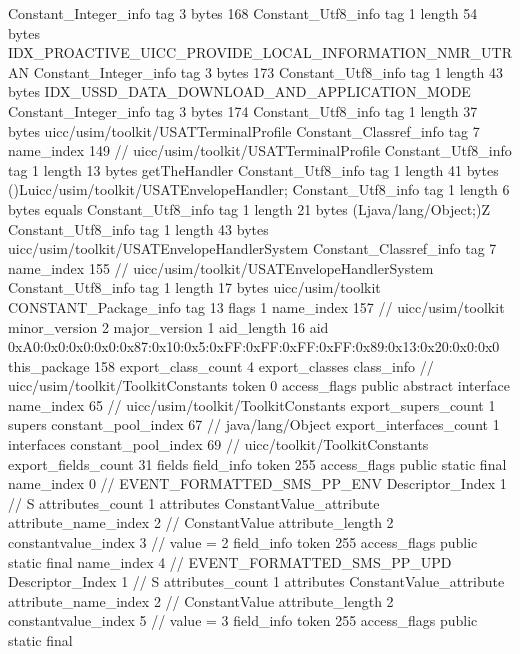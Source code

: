 {{{		}
		Constant_Integer_info {
			tag	3
			bytes	168
		}
		Constant_Utf8_info {
			tag	1
			length	54
			bytes	IDX_PROACTIVE_UICC_PROVIDE_LOCAL_INFORMATION_NMR_UTRAN
		}
		Constant_Integer_info {
			tag	3
			bytes	173
		}
		Constant_Utf8_info {
			tag	1
			length	43
			bytes	IDX_USSD_DATA_DOWNLOAD_AND_APPLICATION_MODE
		}
		Constant_Integer_info {
			tag	3
			bytes	174
		}
		Constant_Utf8_info {
			tag	1
			length	37
			bytes	uicc/usim/toolkit/USATTerminalProfile
		}
		Constant_Classref_info {
			tag	7
			name_index	149		// uicc/usim/toolkit/USATTerminalProfile
		}
		Constant_Utf8_info {
			tag	1
			length	13
			bytes	getTheHandler
		}
		Constant_Utf8_info {
			tag	1
			length	41
			bytes	()Luicc/usim/toolkit/USATEnvelopeHandler;
		}
		Constant_Utf8_info {
			tag	1
			length	6
			bytes	equals
		}
		Constant_Utf8_info {
			tag	1
			length	21
			bytes	(Ljava/lang/Object;)Z
		}
		Constant_Utf8_info {
			tag	1
			length	43
			bytes	uicc/usim/toolkit/USATEnvelopeHandlerSystem
		}
		Constant_Classref_info {
			tag	7
			name_index	155		// uicc/usim/toolkit/USATEnvelopeHandlerSystem
		}
		Constant_Utf8_info {
			tag	1
			length	17
			bytes	uicc/usim/toolkit
		}
		CONSTANT_Package_info {
			tag	13
			flags	1
			name_index	157		// uicc/usim/toolkit
			minor_version	2
			major_version	1
			aid_length	16
			aid	0xA0:0x0:0x0:0x0:0x87:0x10:0x5:0xFF:0xFF:0xFF:0xFF:0x89:0x13:0x20:0x0:0x0
		}
	}
	this_package	158
	export_class_count	4
	export_classes {
		class_info {		// uicc/usim/toolkit/ToolkitConstants
			token	0
			access_flags	public abstract interface
			name_index	65		// uicc/usim/toolkit/ToolkitConstants
			export_supers_count	1
			supers {
				constant_pool_index	67		// java/lang/Object
			}
			export_interfaces_count	1
			interfaces {
				constant_pool_index	69		// uicc/toolkit/ToolkitConstants
			}
			export_fields_count	31
			fields {
			field_info {
				token	255
				access_flags	public static final
				name_index	0		// EVENT_FORMATTED_SMS_PP_ENV
				Descriptor_Index	1		// S
				attributes_count	1
				attributes {
				ConstantValue_attribute {
					attribute_name_index	2		// ConstantValue
					attribute_length	2
					constantvalue_index	3		// value = 2
				}
				}
			}
			field_info {
				token	255
				access_flags	public static final
				name_index	4		// EVENT_FORMATTED_SMS_PP_UPD
				Descriptor_Index	1		// S
				attributes_count	1
				attributes {
				ConstantValue_attribute {
					attribute_name_index	2		// ConstantValue
					attribute_length	2
					constantvalue_index	5		// value = 3
				}
				}
			}
			field_info {
				token	255
				access_flags	public static final
}}}}}
